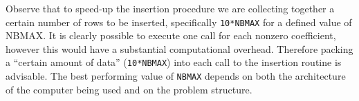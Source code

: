 \documentclass[twoside,a4paper]{refart}
\theoremstyle{definition}
\begin{document}
Observe that to speed-up the insertion procedure we are collecting together a certain number of rows to be inserted, specifically \texttt{10*NBMAX} for a defined value of NBMAX. It is clearly possible to execute one call for
each nonzero coefficient, however this would have a substantial computational
overhead. Therefore packing a ``certain amount of data'' (\texttt{10*NBMAX}) into each call
to the insertion routine is advisable. The best performing value of \texttt{NBMAX} depends on both the architecture of the computer being used and
on the problem structure.

\printbibliography[heading=bibintoc]
\end{document}
